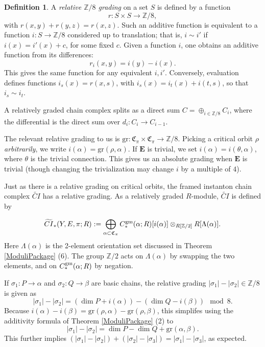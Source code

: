 \documentclass[10pt,a4paper]{amsart}
\theoremstyle{definition}
\newtheorem{definition}[theorem]{Definition}
\theoremstyle{remark}
\numberwithin{figure}{qchap}
\begin{document}
\begin{definition}\label{relgrading}A \emph{relative $\mathbb Z/8$ grading} on a set $S$ is defined by a function 
$$r: S \times S \to \mathbb Z/8,$$ 
with $r(x,y) + r(y,z) = r(x,z)$. Such an additive function is equivalent to a function $i: S \to \mathbb Z/8$ considered up to translation; that is, $i \sim i'$ if $i(x) = i'(x) + c$, for some fixed $c$. Given a function $i$, one obtains an additive function from its differences: $$r_i(x,y) = i(y) - i(x).$$ This gives the same function for any equivalent $i, i'$. Conversely, evaluation defines functions $i_s(x) = r(x,s)$, with $i_s(x) = i_t(x) + i(t,s)$, so that $i_s \sim i_t$. 

A relatively graded chain complex splits as a direct sum $C = \oplus_{i \in \mathbb Z/8} C_i$, where the differential is the direct sum over $d_i: C_i \to C_{i-1}$. 
\end{definition}

The relevant relative grading to us is $\text{gr}: \mathfrak C_\pi \times \mathfrak C_\pi \to \mathbb Z/8$. Picking a critical orbit $\rho$ \emph{arbitrarily}, we write $i(\alpha) = \text{gr}(\rho, \alpha)$. If $\mathbf{E}$ is trivial, we set $i(\alpha) = i(\theta, \alpha)$, where $\theta$ is the trivial connection. This gives us an absolute grading when $\mathbf{E}$ is trivial (though changing the trivialization may change $i$ by a multiple of $4$). 

Just as there is a relative grading on critical orbits, the framed instanton chain complex $\widetilde{CI}$ has a relative grading. As a relatively graded $R$-module, $\widetilde{CI}$ is defined by

$$\widetilde{CI}_*(Y,E,\pi;R) := \bigoplus_{\alpha \subset \mathfrak C_\pi} C_{*}^{\textup{gm}}(\alpha;R)[i(\alpha)] \otimes_{R[\mathbb Z/2]} R[\Lambda(\alpha)].$$ Here $\Lambda(\alpha)$ is the 2-element orientation set discussed in Theorem \ref{ModuliPackage} (6). The group $\mathbb Z/2$ acts on $\Lambda(\alpha)$ by swapping the two elements, and on $C_*^{\text{\textup{gm}}}(\alpha;R)$ by negation.

If $\sigma_1: P \to \alpha$ and $\sigma_2: Q \to \beta$ are basic chains, the relative grading $|\sigma_1| - |\sigma_2| \in \mathbb Z/8$ is given as $$|\sigma_1| - |\sigma_2| =  (\dim P + i(\alpha)) - (\dim Q - i(\beta))\mod{8}.$$ Because $i(\alpha) - i(\beta) = \text{gr}(\rho, \alpha) - \text{gr}(\rho, \beta)$, this simplifes using the additivity formula of Theorem \ref{ModuliPackage} (2) to $$|\sigma_1| - |\sigma_2| = \dim P - \dim Q + \text{gr}(\alpha, \beta).$$ This further implies $(|\sigma_1| - |\sigma_2|) + (|\sigma_2| - |\sigma_3|) = |\sigma_1| - |\sigma_3|$, as expected.
\end{document}
